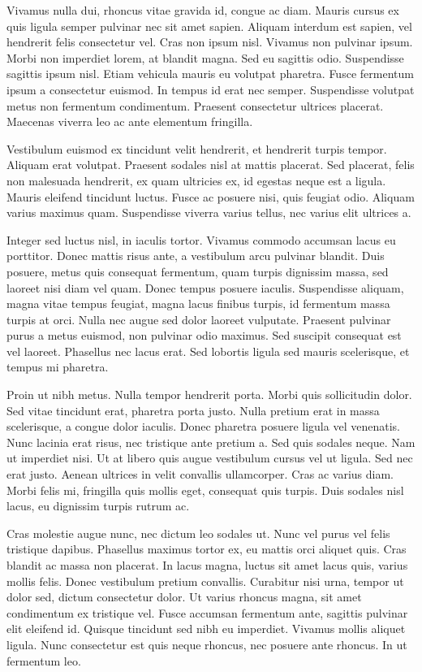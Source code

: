 Vivamus nulla dui, rhoncus vitae gravida id, congue ac diam. Mauris cursus ex
quis ligula semper pulvinar nec sit amet sapien. Aliquam interdum est sapien,
vel hendrerit felis consectetur vel. Cras non ipsum nisl. Vivamus non pulvinar
ipsum. Morbi non imperdiet lorem, at blandit magna. Sed eu sagittis odio.
Suspendisse sagittis ipsum nisl. Etiam vehicula mauris eu volutpat pharetra.
Fusce fermentum ipsum a consectetur euismod. In tempus id erat nec semper.
Suspendisse volutpat metus non fermentum condimentum. Praesent consectetur
ultrices placerat. Maecenas viverra leo ac ante elementum fringilla.

Vestibulum euismod ex tincidunt velit hendrerit, et hendrerit turpis tempor.
Aliquam erat volutpat. Praesent sodales nisl at mattis placerat. Sed placerat,
felis non malesuada hendrerit, ex quam ultricies ex, id egestas neque est a
ligula. Mauris eleifend tincidunt luctus. Fusce ac posuere nisi, quis feugiat
odio. Aliquam varius maximus quam. Suspendisse viverra varius tellus, nec
varius elit ultrices a.

Integer sed luctus nisl, in iaculis tortor. Vivamus commodo accumsan lacus eu
porttitor. Donec mattis risus ante, a vestibulum arcu pulvinar blandit. Duis
posuere, metus quis consequat fermentum, quam turpis dignissim massa, sed
laoreet nisi diam vel quam. Donec tempus posuere iaculis. Suspendisse aliquam,
magna vitae tempus feugiat, magna lacus finibus turpis, id fermentum massa
turpis at orci. Nulla nec augue sed dolor laoreet vulputate. Praesent pulvinar
purus a metus euismod, non pulvinar odio maximus. Sed suscipit consequat est
vel laoreet. Phasellus nec lacus erat. Sed lobortis ligula sed mauris
scelerisque, et tempus mi pharetra.

Proin ut nibh metus. Nulla tempor hendrerit porta. Morbi quis sollicitudin
dolor. Sed vitae tincidunt erat, pharetra porta justo. Nulla pretium erat in
massa scelerisque, a congue dolor iaculis. Donec pharetra posuere ligula vel
venenatis. Nunc lacinia erat risus, nec tristique ante pretium a. Sed quis
sodales neque. Nam ut imperdiet nisi. Ut at libero quis augue vestibulum cursus
vel ut ligula. Sed nec erat justo. Aenean ultrices in velit convallis
ullamcorper. Cras ac varius diam. Morbi felis mi, fringilla quis mollis eget,
consequat quis turpis. Duis sodales nisl lacus, eu dignissim turpis rutrum ac.

Cras molestie augue nunc, nec dictum leo sodales ut. Nunc vel purus vel felis
tristique dapibus. Phasellus maximus tortor ex, eu mattis orci aliquet quis.
Cras blandit ac massa non placerat. In lacus magna, luctus sit amet lacus quis,
varius mollis felis. Donec vestibulum pretium convallis. Curabitur nisi urna,
tempor ut dolor sed, dictum consectetur dolor. Ut varius rhoncus magna, sit
amet condimentum ex tristique vel. Fusce accumsan fermentum ante, sagittis
pulvinar elit eleifend id. Quisque tincidunt sed nibh eu imperdiet. Vivamus
mollis aliquet ligula. Nunc consectetur est quis neque rhoncus, nec posuere
ante rhoncus. In ut fermentum leo.

